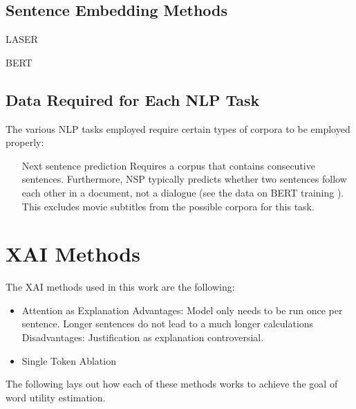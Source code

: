 \subsection{Sentence Embedding Methods}

\begin{description}
	\item[LASER] \cite{artetxeMassivelyMultilingualSentence2019}
	\item[BERT] \cite{reimersMakingMonolingualSentence2020}
\end{description}

\subsection{Data Required for Each NLP Task}
The various NLP tasks employed require certain types of corpora to be employed properly:

\begin{itemize}
	\item[Next sentence prediction]
	      Requires a corpus that contains consecutive sentences.
	      Furthermore, NSP typically predicts whether two sentences follow each other in a document, not a dialogue (see the data on BERT training \cite{kentonBertPretrainingDeep2019}).
	      This excludes movie subtitles from the possible corpora for this task.

\end{itemize}

\section{XAI Methods}

The XAI methods used in this work are the following:
\begin{itemize}
	\item Attention as Explanation
	      Advantages:
	      Model only needs to be run once per sentence.
	      Longer sentences do not lead to a much longer calculations
	      Disadvantages: Justification as explanation controversial.
	\item Single Token Ablation
\end{itemize}

The following lays out how each of these methods works to achieve the goal of word utility estimation.

